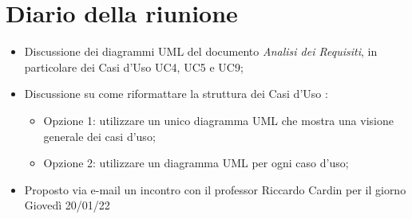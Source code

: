\section{Diario della riunione}
\begin{itemize}
  \item Discussione dei diagrammi UML del documento \textit{Analisi dei Requisiti}, in particolare dei Casi d'Uso UC4, UC5 e UC9;
  \item Discussione su come riformattare la struttura dei Casi d'Uso :
  \begin{itemize}
    \item Opzione 1: utilizzare un unico diagramma UML che mostra una visione generale dei casi d'uso;
    \item Opzione 2: utilizzare un diagramma UML per ogni caso d'uso;
  \end{itemize}
  \item Proposto via e-mail un incontro con il professor Riccardo Cardin per il giorno Giovedì 20/01/22

\end{itemize}
